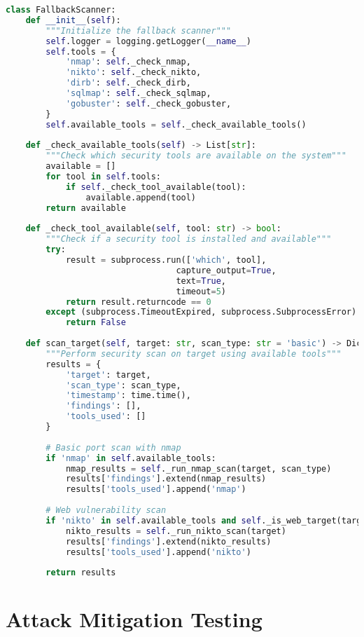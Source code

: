\documentclass[12pt,a4paper]{report}
\begin{document}
\begin{lstlisting}[language=Python,caption={Fallback Scanner Implementation}]
class FallbackScanner:
    def __init__(self):
        """Initialize the fallback scanner"""
        self.logger = logging.getLogger(__name__)
        self.tools = {
            'nmap': self._check_nmap,
            'nikto': self._check_nikto,
            'dirb': self._check_dirb,
            'sqlmap': self._check_sqlmap,
            'gobuster': self._check_gobuster,
        }
        self.available_tools = self._check_available_tools()
        
    def _check_available_tools(self) -> List[str]:
        """Check which security tools are available on the system"""
        available = []
        for tool in self.tools:
            if self._check_tool_available(tool):
                available.append(tool)
        return available
    
    def _check_tool_available(self, tool: str) -> bool:
        """Check if a security tool is installed and available"""
        try:
            result = subprocess.run(['which', tool], 
                                  capture_output=True, 
                                  text=True, 
                                  timeout=5)
            return result.returncode == 0
        except (subprocess.TimeoutExpired, subprocess.SubprocessError):
            return False
    
    def scan_target(self, target: str, scan_type: str = 'basic') -> Dict:
        """Perform security scan on target using available tools"""
        results = {
            'target': target,
            'scan_type': scan_type,
            'timestamp': time.time(),
            'findings': [],
            'tools_used': []
        }
        
        # Basic port scan with nmap
        if 'nmap' in self.available_tools:
            nmap_results = self._run_nmap_scan(target, scan_type)
            results['findings'].extend(nmap_results)
            results['tools_used'].append('nmap')
        
        # Web vulnerability scan
        if 'nikto' in self.available_tools and self._is_web_target(target):
            nikto_results = self._run_nikto_scan(target)
            results['findings'].extend(nikto_results)
            results['tools_used'].append('nikto')
        
        return results
\end{lstlisting}

\section{Attack Mitigation Testing}
\end{document}
